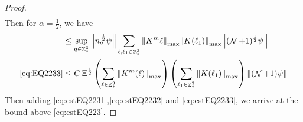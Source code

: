 \documentclass[sn-mathphys, Numbered ,a4paper]{sn-jnl}%
\DeclareMathOperator{\Z}{\mathbb{Z}}
\DeclareMathOperator{\NN}{\mathcal{N}}
\newcommand{\half}{\frac{1}{2}}
\theoremstyle{plain}
\theoremstyle{definition}
\theoremstyle{remark}
\theoremstyle{plain}
\theoremstyle{definition}
\theoremstyle{remark}
\begin{document}
\begin{proof}
\begin{align}
	\end{align} 
	Then for $\alpha = \half$, we have
	\begin{align}
		&\leq  \sup\limits_{q \in \Z^3_*} \norm{ n_{q}^{\,\half} \psi } \sum\limits_{\ell, \ell_1\in \Z^3_*}  \norm{K^m{\ell}}_{\mathrm{max}} \norm{K(\ell_1)}_{\mathrm{max}} \norm{ (\NN+1)^{\frac{1}{2}} \psi}  \nonumber\\
		\eqref{eq:EQ2233}&\leq C\, \Xi^\half \left(\sum\limits_{\ell\in \Z^3_*} \norm{K^m(\ell)}_{\mathrm{max}}\right)\left(  \sum\limits_{ \ell_1\in \Z^3_*}  \norm{ K(\ell_1)}_{\mathrm{max}} \right) \norm{ (\NN+1) \psi}\label{eq:estEQ2233} 
	\end{align}
	Then adding \eqref{eq:estEQ2231},\eqref{eq:estEQ2232} and \eqref{eq:estEQ2233}, we arrive at the bound above \eqref{eq:estEQ223}. 
\end{proof}
\end{document}
